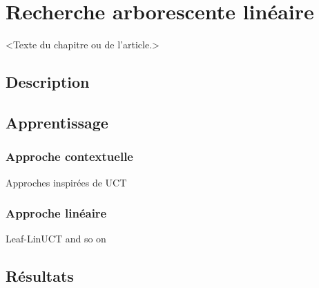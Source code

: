 \chapter{Recherche arborescente linéaire}
\label{chap:linmcts}                   %

<Texte du chapitre ou de l'article.>

\section{Description}

\section{Apprentissage}

\subsection{Approche contextuelle}

Approches inspirées de UCT

\subsection{Approche linéaire}

Leaf-LinUCT and so on

\section{Résultats}
